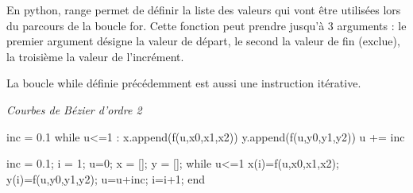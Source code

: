 \documentclass[10pt]{article}
\begin{document}
\begin{rem}
En python, \textsf{range} permet de définir la liste des valeurs qui vont être utilisées lors du parcours de la boucle \textsf{for}.  Cette fonction peut prendre jusqu'à 3 arguments : le premier argument désigne la valeur de départ, le second la valeur de fin (exclue), la troisième la valeur de l'incrément. 
\end{rem}

\begin{rem}
La boucle \textsf{while} définie précédemment est aussi une instruction itérative. 
\end{rem}


\begin{exemple}
\textit{Courbes de Bézier d'ordre 2}


\begin{minipage}[c]{.49\linewidth}
\begin{py}
\begin{python}
inc = 0.1
while u<=1 :
    x.append(f(u,x0,x1,x2))
    y.append(f(u,y0,y1,y2))
    u += inc
\end{python}
\end{py}
\end{minipage}\hfill
\begin{minipage}[c]{.49\linewidth}
\begin{sci}
\begin{scilab}
inc = 0.1; i = 1;
u=0;
x = []; y = [];
while u<=1
    x(i)=f(u,x0,x1,x2);
    y(i)=f(u,y0,y1,y2);
    u=u+inc;
    i=i+1;
end
\end{scilab}
\end{sci}
\end{minipage}

\end{exemple}



\begin{thebibliography}{2}
\end{thebibliography}
\end{document}
